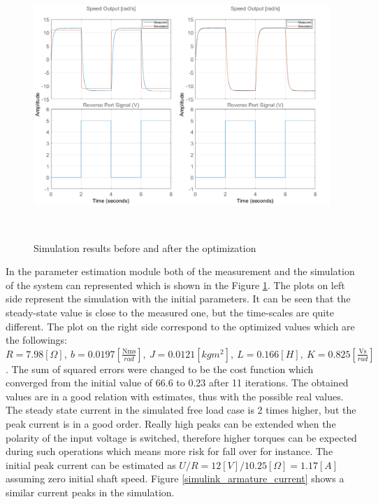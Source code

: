 \documentclass[12pt,english]{article}
\begin{document}
\begin{figure}[htb!]
	\centering
	\includegraphics[height=10cm]{figures/simulink_par_est_1.png}
	\caption{Simulation results before and after the optimization}
	\label{simulink_par_est_1}
\end{figure}
 In the parameter estimation module both of the measurement and the simulation of the system can represented which is shown in the Figure \ref{simulink_par_est_1}. The plots on left side represent the simulation with the initial parameters. It can be seen that the steady-state value is close to the measured one, but the time-scales are quite different. The plot on the right side correspond to the optimized values which are the followings: $R=7.98[\Omega],~b=0.0197[\frac{\text{Nms}}{rad}],~J=0.0121[kgm^2],~L=0.166[H],~K=0.825[\frac{\text{Vs}}{rad}]$. The sum of squared errors were changed to be the cost function which converged from the initial value of 66.6 to 0.23 after 11 iterations. The obtained values are in a good relation with estimates, thus with the possible real values. The steady state current in the simulated free load case is 2 times higher, but the peak current is in a good order. Really high peaks can be extended when the polarity of the input voltage is switched, therefore higher torques can be expected during such operations which means more risk for fall over for instance. The initial peak current can be estimated as $U/R = 12[V]/10.25[\Omega] = 1.17 [A]$ assuming zero initial shaft speed. Figure \ref{simulink_armature_current} shows a similar current peaks in the simulation.
\end{document}
